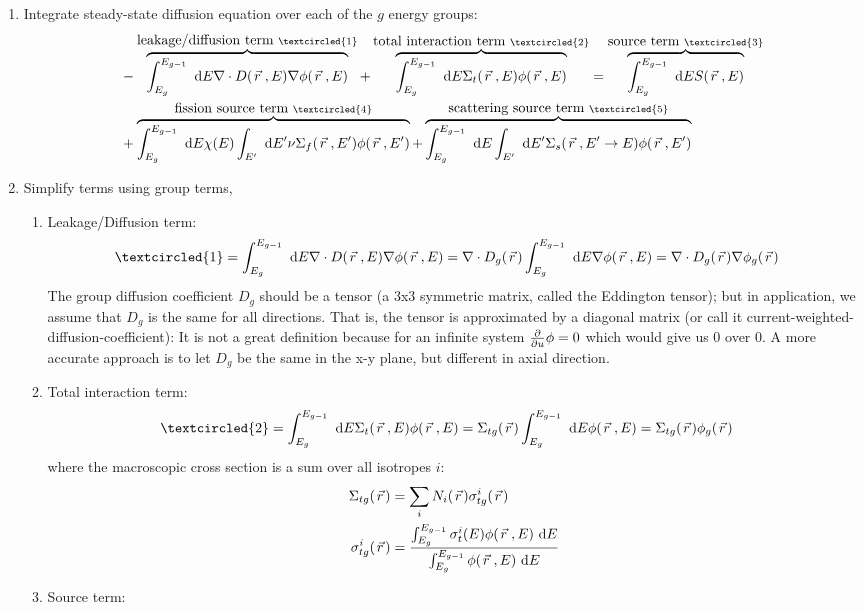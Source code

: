 \documentclass{school-22.211-notes}
\begin{document}
\begin{enumerate}
\item Integrate steady-state diffusion equation over each of the $g$ energy groups: 
\begin{align}
& - \overbrace{\int_{E_g}^{E_{g-1}} \dE \divergence D(\vecr, E) \gradient \phi(\vecr, E)}^{\mbox{leakage/diffusion term }\textcircled{1}} + 
\overbrace{\int_{E_g}^{E_{g-1}} \dE \Sigma_t(\vecr, E) \phi(\vecr, E)}^{\mbox{total interaction term }\textcircled{2}} = \overbrace{\int_{E_g}^{E_{g-1}} \dE S(\vecr, E)}^{\mbox{source term } \textcircled{3}}  \\
& + \overbrace{\int_{E_g}^{E_{g-1}} \dE \chi(E) \int_{E'} \dE' \nu \Sigma_f (\vecr, E') \phi(\vecr, E')}^{\mbox{fission source term }\textcircled{4}} 
 + \overbrace{\int_{E_g}^{E_{g-1}} \dE \int_{E'} \dE' \Sigma_s(\vecr, E'\to E) \phi(\vecr, E')}^{\mbox{scattering source term }\textcircled{5}} 
\end{align}

\item Simplify terms using group terms,
  \begin{enumerate}
  \item Leakage/Diffusion term: 
    \begin{align}
      \textcircled{1} &=\int_{E_g}^{E_{g-1}} \dE \divergence D(\vecr, E) \gradient \phi(\vecr, E) =  \divergence D_g(\vecr) \int_{E_g}^{E_{g-1}} \dE \gradient \phi(\vecr, E) = \divergence D_g (\vecr) \gradient \phi_g(\vecr) 
    \end{align}
    The group diffusion coefficient $D_g$ should be a tensor (a 3x3 symmetric matrix, called the Eddington tensor); but in application, we assume that $D_g$ is the same for all directions. That is, the tensor is approximated by a diagonal matrix (or call it current-weighted-diffusion-coefficient): 
    It is not a great definition because for an infinite system $\frac{\partial}{\partial u} \phi = 0$ which would give us 0 over 0. A more accurate approach is to let $D_g$ be the same in the x-y plane, but different in axial direction. 

  \item Total interaction term: 
    \begin{align}
      \textcircled{2} &= \int_{E_g}^{E_{g-1}} \dE \Sigma_t(\vecr, E) \phi(\vecr, E) = \Sigma_{tg}(\vecr) \int_{E_g}^{E_{g-1}} \dE \phi(\vecr, E) = \Sigma_{tg} (\vecr) \phi_g(\vecr) 
    \end{align}
    where the macroscopic cross section is a sum over all isotropes $i$:
    \begin{align}
      \Sigma_{tg}(\left.\vec{r}\right.) &= \displaystyle\sum_{i} N_i(\left.\vec{r}\right.) \sigma_{tg}^i (\left.\vec{r}\right.) \\
      \sigma_{tg}^i (\left.\vec{r}\right.) &= \frac{\int_{E_g}^{E_{g-1}} \sigma_t^i (E) \phi(\left.\vec{r}\right., E) \mbox{ }\mathrm{d} E }{\int_{E_g}^{E_{g-1}} \phi(\left.\vec{r}\right., E) \mbox{ }\mathrm{d} E}
    \end{align}
  \item Source term: 


\end{enumerate}
\end{enumerate}
\end{document}
